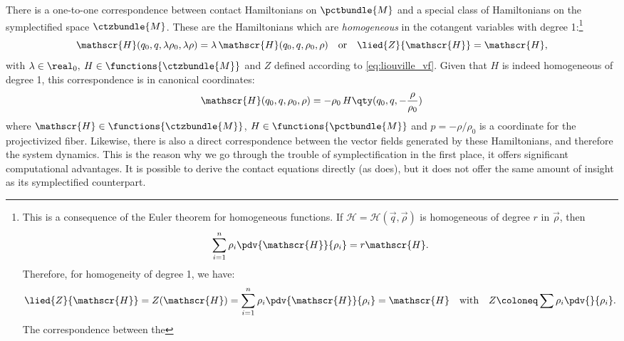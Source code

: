 There is a one-to-one correspondence between contact Hamiltonians on $\pctbundle{M}$ and a special class of Hamiltonians on the symplectified space $\ctzbundle{M}$. These are the Hamiltonians which are \emph{homogeneous} in the cotangent variables with degree 1:\footnote
{This is a consequence of the Euler theorem for homogeneous functions. If $\mathscr{H} = \mathscr{H}(\vec{q}, \vec{\rho})$ is homogeneous of degree $r$ in $\vec{\rho}$, then
    $$ \sum_{i = 1}^n \rho_i \pdv{\mathscr{H}}{\rho_i} = r \mathscr{H}. $$
 Therefore, for homogeneity of degree 1, we have: 
 $$ \lied{Z}{\mathscr{H}} = Z(\mathscr{H}) = \sum_{i=1}^n \rho_i \pdv{\mathscr{H}}{\rho_i} = \mathscr{H} \quad \text{with}\quad Z \coloneq \sum \rho_i \pdv{}{\rho_i}. $$
 The correspondence between the 
}
\begin{equation}
    \mathscr{H}(q_0, q, \lambda \rho_0, \lambda \rho) = \lambda\,\mathscr{H}(q_0, q, \rho_0, \rho) \quad \text{or} \quad \lied{Z}{\mathscr{H}} = \mathscr{H},
\end{equation}
with $\lambda \in \real_0,\: H \in \functions{\ctzbundle{M}}$ and $Z$ defined according to \cref{eq:liouville_vf}. Given that $H$ is indeed homogeneous of degree 1, this correspondence is in canonical coordinates:
\begin{equation}
    \mathscr{H}(q_0, q, \rho_0, \rho) = -\rho_0\,H\qty(q_0, q, -\frac{\rho}{\rho_0})
    \label{eq:H_correspondence}
\end{equation}
where $\mathscr{H} \in \functions{\ctzbundle{M}}$, $H \in \functions{\pctbundle{M}}$ and $p = -\rho / \rho_0$ is a coordinate for the projectivized fiber. Likewise, there is also a direct correspondence between the vector fields generated by these Hamiltonians, and therefore the system dynamics. This is the reason why we go through the trouble of symplectification in the first place, it offers significant computational advantages. It is possible to derive the contact equations directly (as \citet{Bravetti2017} does), but it does not offer the same amount of insight as its symplectified counterpart. \cite{VanderSchaft2021a,Arnold1989}


